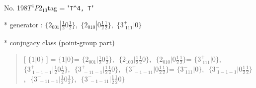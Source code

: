 \documentclass[fleqn,10pt,landscape]{jsarticle}
\begin{document}
\newpage

No. 198\quad$T_{}^{4}$\quad$P2_13$\quad[ cubic ]
tag = "{\tt T^4, T}"

* generator : $\{2{}_{001}|\frac{1}{2} 0 \frac{1}{2}\},\,\,\{2{}_{010}|0 \frac{1}{2} \frac{1}{2}\},\,\,\{3^{+}_{\,\,111}|0\}$

* conjugacy class (point-group part)
\begin{quote}
[ $\{1|0\}$ ] = \quad $\{1|0\}$ = \quad $\{2{}_{001}|\frac{1}{2} 0 \frac{1}{2}\}$,\,\, $\{2{}_{100}|\frac{1}{2} \frac{1}{2} 0\}$,\,\, $\{2{}_{010}|0 \frac{1}{2} \frac{1}{2}\}$\newline[ $\{3^{+}_{\,\,111}|0\}$ ] = \quad $\{3^{+}_{\,\,111}|0\}$,\,\, $\{3^{+}_{\,\,1-1-1}|\frac{1}{2} 0 \frac{1}{2}\}$,\,\, $\{3^{+}_{\,\,-11-1}|\frac{1}{2} \frac{1}{2} 0\}$,\,\, $\{3^{+}_{\,\,-1-11}|0 \frac{1}{2} \frac{1}{2}\}$\newline[ $\{3^{-}_{\,\,111}|0\}$ ] = \quad $\{3^{-}_{\,\,111}|0\}$,\,\, $\{3^{-}_{\,\,1-1-1}|0 \frac{1}{2} \frac{1}{2}\}$,\,\, $\{3^{-}_{\,\,-11-1}|\frac{1}{2} 0 \frac{1}{2}\}$,\,\, $\{3^{-}_{\,\,-1-11}|\frac{1}{2} \frac{1}{2} 0\}$\newline
\end{quote}
\end{document}
